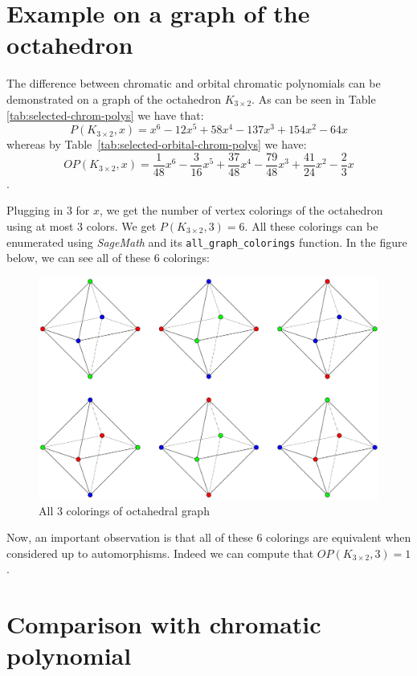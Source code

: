 \section{Example on a graph of the octahedron}

The difference between chromatic and orbital chromatic polynomials can be demonstrated on a graph of the octahedron $K_{3 \times 2}$. As can be seen in Table \ref{tab:selected-chrom-polys} we have that: $$P(K_{3 \times 2},x) = x^{6} - 12x^{5} + 58x^{4} - 137x^{3} + 154x^{2} - 64x$$ whereas by Table~\ref{tab:selected-orbital-chrom-polys} 
 we have: $$OP(K_{3 \times 2},x) = \frac{1}{48}x^{6} - \frac{3}{16}x^{5} + \frac{37}{48}x^{4} - \frac{79}{48}x^{3} + \frac{41}{24}x^{2} - \frac{2}{3}x$$.

Plugging in $3$ for $x$, we get the number of vertex colorings of the octahedron using at most $3$ colors. We get $P(K_{3 \times 2},3) = 6$. All these colorings can be enumerated using \textit{SageMath} \cite{sagemath} and its \verb|all_graph_colorings| function. In the figure below, we can see all of these $6$ colorings:

\begin{figure}[H]
    \centering
    \includegraphics[width=1\textwidth]{../Resources/Figs/octahedron-3-clrings.pdf}
    \caption{All 3 colorings of octahedral graph}
    \label{fig:octahedron-3-clrings}
\end{figure}

Now, an important observation is that all of these $6$ colorings are equivalent when considered up to automorphisms. Indeed we can compute that $OP(K_{3 \times 2},3) = 1$.


\section{Comparison with chromatic polynomial}


